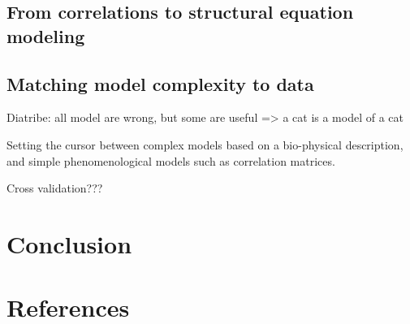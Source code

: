 \documentclass[5p]{elsarticle}
\begin{document}
\subsection{From correlations to structural equation modeling}

\cite{mcintosh1994}
\cite{marrelec2007}
\cite{marrelec2009}

\subsection{Matching model complexity to data}

Diatribe: all model are wrong, but some are useful => a cat is a model of a cat

Setting the cursor between complex models based on a bio-physical
description, and simple phenomenological models such as correlation
matrices.

\cite{mcintosh2010}

Cross validation???



\section{Conclusion}

{
\section*{References} \small 
 }

\end{document}
